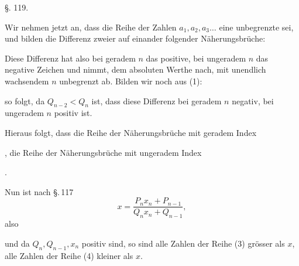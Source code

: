 
\begin{center}
§. 119.

\end{center}

Wir nehmen jetzt an, dass die Reihe der Zahlen $a_1, a_2, a_3 \ldots$
eine unbegrenzte sei, und bilden die Differenz zweier auf einander
folgender Näherungsbrüche:

Diese Differenz hat also bei geradem $n$ das positive, bei
ungeradem $n$ das negative Zeichen und nimmt, dem absoluten
Werthe nach, mit unendlich wachsendem $n$ unbegrenzt ab. Bilden
wir noch aus (1):

so folgt, da $Q_{n-2} < Q_n$ ist, dass diese Differenz bei geradem $n$
negativ, bei ungeradem $n$ positiv ist.

Hieraus folgt, dass die Reihe der Näherungsbrüche mit geradem
Index

, die Reihe der Näherungsbrüche mit ungeradem
Index

.

Nun ist nach \S.\,117
\[
x = \frac{P_n x_n + P_{n-1}}{Q_n x_n + Q_{n-1}},
\]
also

und da $Q_n, Q_{n-1}, x_n$ positiv sind, so sind alle Zahlen der Reihe
(3) grösser als $x$, alle Zahlen der Reihe (4) kleiner als $x$.
